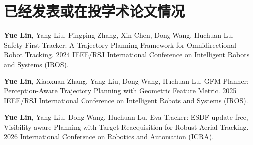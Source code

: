 
\chapter*{\hfill 已经发表或在投学术论文情况 \hfill}
\begin{enumerate}[label={[\arabic*]}]
  \item {\song\bf Yue Lin}, Yang Liu, Pingping Zhang, Xin Chen, Dong Wang, Huchuan Lu. Safety-First Tracker: A Trajectory Planning Framework for Omnidirectional Robot Tracking. 2024 IEEE/RSJ International Conference on Intelligent Robots and Systems (IROS).
  \item {\song\bf Yue Lin}, Xiaoxuan Zhang, Yang Liu, Dong Wang, Huchuan Lu. GFM-Planner: Perception-Aware Trajectory Planning with Geometric Feature Metric. 2025 IEEE/RSJ International Conference on Intelligent Robots and Systems (IROS).
  \item {\song\bf Yue Lin}, Yang Liu, Dong Wang, Huchuan Lu. Eva-Tracker: ESDF-update-free, Visibility-aware Planning with Target Reacquisition for Robust Aerial Tracking. 2026 International Conference on Robotics and Automation (ICRA).
\end{enumerate}